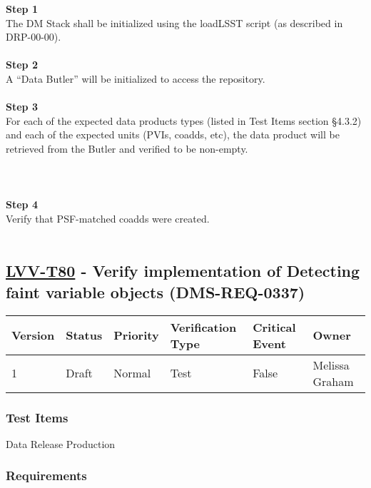 \textbf{Step 1}\\
The DM Stack shall be initialized using the loadLSST script (as
described in DRP-00-00).\\
~\\
\textbf{Step 2}\\
A ``Data Butler'' will be initialized to access the repository.\\
~\\
\textbf{Step 3}\\
For each of the expected data products types (listed in Test Items
section §4.3.2) and each of the expected units (PVIs, coadds, etc), the
data product will be retrieved from the Butler and verified to be
non-empty.\\
~\\
~\\
~\\
\textbf{Step 4}\\
Verify that PSF-matched coadds were created.\\
~\\

\hypertarget{lvv-t80---verify-implementation-of-detecting-faint-variable-objects-dms-req-0337}{%
\subsection{\texorpdfstring{\href{https://jira.lsstcorp.org/secure/Tests.jspa\#/testCase/LVV-T80}{LVV-T80}
- Verify implementation of Detecting faint variable objects
(DMS-REQ-0337)}{LVV-T80 - Verify implementation of Detecting faint variable objects (DMS-REQ-0337)}}\label{lvv-t80---verify-implementation-of-detecting-faint-variable-objects-dms-req-0337}}

\begin{longtable}[]{@{}llllll@{}}
\toprule
Version & Status & Priority & Verification Type & Critical Event &
Owner\tabularnewline
\midrule
\endhead
1 & Draft & Normal & Test & False & Melissa Graham\tabularnewline
\bottomrule
\end{longtable}

\hypertarget{test-items-56}{%
\subsubsection{Test Items}\label{test-items-56}}

Data Release Production

\hypertarget{requirements-57}{%
\subsubsection{Requirements}\label{requirements-57}}

